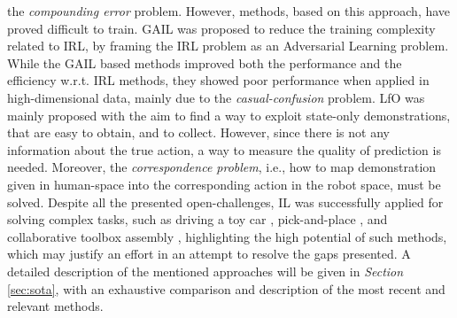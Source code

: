 the \textit{compounding error} problem. However, methods, based on this approach, have proved difficult to train. GAIL was proposed to reduce
the training complexity related to IRL, by framing the IRL problem as an Adversarial Learning problem. While the GAIL based methods 
improved both the performance and the efficiency w.r.t. IRL methods, they showed poor performance when applied in
high-dimensional data, mainly due to the \textit{casual-confusion} problem. LfO was mainly proposed with
the aim to find a way to exploit state-only demonstrations, that are easy to obtain, and to collect. However, since
there is not any information about the true action, a way to measure the quality of prediction is needed. Moreover, the
\textit{correspondence problem}, i.e., how to map demonstration given in human-space into the corresponding action in the robot
space, must be solved.     
\newline Despite all the presented open-challenges, IL was successfully applied for solving complex tasks, such as
driving a toy car \cite{codevilla2018end_to_end}, pick-and-place \cite{zhang2018deep_vr_teleoperation}, and collaborative toolbox
assembly \cite{maeda2017probabilistic}, highlighting the high potential of such methods, which may justify an effort in
an attempt to resolve the gaps presented. A detailed description of the mentioned approaches will be given in
\textit{Section} \ref{sec:sota}, with an exhaustive comparison and description of the most recent and relevant methods.


